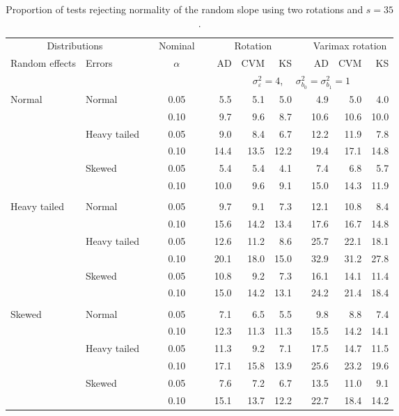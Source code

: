 \begin{table}[ht]
\centering
\caption{\label{tab:fixedsimb135} Proportion of tests rejecting normality of the random slope using two rotations and $s = 35$.}
\begin{scriptsize}
\begin{tabular}{ll p{.1cm} c p{.1cm} rrr p{.1cm} rrr}
  \hline
  \multicolumn{2}{c}{Distributions}& & Nominal & &  \multicolumn{3}{c}{Rotation} & & \multicolumn{3}{c}{Varimax rotation} \\ \cline{1-2} \cline{6-8} \cline{10-12}   
  Random effects & Errors & & $\alpha$ & & AD & CVM & KS & & AD & CVM & KS \\ 
   \hline
& && && \multicolumn{7}{c}{$\sigma_{\varepsilon}^2 = 4$, \ \ $\sigma_{b_0}^2 = \sigma_{b_1}^2 = 1$} \\ \cline{6-12}
\rowcolor{gray!20} Normal & Normal &  & 0.05 &  & 5.5 & 5.1 & 5.0 &  & 4.9 & 5.0 & 4.0 \\ 
\rowcolor{gray!20}    &  &  & 0.10 &  & 9.7 & 9.6 & 8.7 &  & 10.6 & 10.6 & 10.0 \\ 
\rowcolor{gray!20}    & Heavy tailed &  & 0.05 &  & 9.0 & 8.4 & 6.7 &  & 12.2 & 11.9 & 7.8 \\ 
\rowcolor{gray!20}    &  &  & 0.10 &  & 14.4 & 13.5 & 12.2 &  & 19.4 & 17.1 & 14.8 \\ 
\rowcolor{gray!20}    & Skewed &  & 0.05 &  & 5.4 & 5.4 & 4.1 &  & 7.4 & 6.8 & 5.7 \\ 
\rowcolor{gray!20}    &  &  & 0.10 &  & 10.0 & 9.6 & 9.1 &  & 15.0 & 14.3 & 11.9 \\ 
&&&&&&&&&&&\\
  Heavy tailed & Normal &  & 0.05 &  & 9.7 & 9.1 & 7.3 &  & 12.1 & 10.8 & 8.4 \\ 
   &  &  & 0.10 &  & 15.6 & 14.2 & 13.4 &  & 17.6 & 16.7 & 14.8 \\ 
   & Heavy tailed &  & 0.05 &  & 12.6 & 11.2 & 8.6 &  & 25.7 & 22.1 & 18.1 \\ 
   &  &  & 0.10 &  & 20.1 & 18.0 & 15.0 &  & 32.9 & 31.2 & 27.8 \\ 
   & Skewed &  & 0.05 &  & 10.8 & 9.2 & 7.3 &  & 16.1 & 14.1 & 11.4 \\ 
   &  &  & 0.10 &  & 15.0 & 14.2 & 13.1 &  & 24.2 & 21.4 & 18.4 \\ 
&&&&&&&&&&&\\
  Skewed & Normal &  & 0.05 &  & 7.1 & 6.5 & 5.5 &  & 9.8 & 8.8 & 7.4 \\ 
   &  &  & 0.10 &  & 12.3 & 11.3 & 11.3 &  & 15.5 & 14.2 & 14.1 \\ 
   & Heavy tailed &  & 0.05 &  & 11.3 & 9.2 & 7.1 &  & 17.5 & 14.7 & 11.5 \\ 
   &  &  & 0.10 &  & 17.1 & 15.8 & 13.9 &  & 25.6 & 23.2 & 19.6 \\ 
   & Skewed &  & 0.05 &  & 7.6 & 7.2 & 6.7 &  & 13.5 & 11.0 & 9.1 \\ 
   &  &  & 0.10 &  & 15.1 & 13.7 & 12.2 &  & 22.7 & 18.4 & 14.2 \\ 


\end{tabular}
\end{scriptsize}
\end{table}
